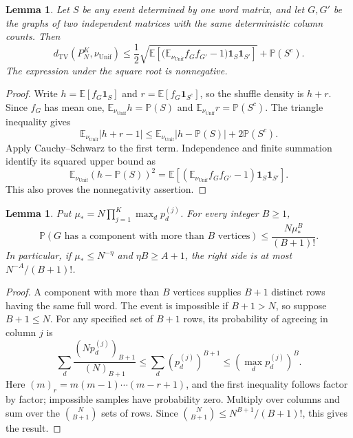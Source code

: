 \documentclass[11pt]{article}
\numberwithin{equation}{section}
\newtheorem{lemma}[theorem]{Lemma}
\theoremstyle{definition}
\theoremstyle{remark}
\newcommand{\E}{\mathbb E}
\newcommand{\Pp}{\mathbb P}
\newcommand{\TV}{\mathrm{TV}}
\newcommand{\Unif}{\mathrm{Unif}}
\newcommand{\dTV}{d_{\TV}}
\newcommand{\nuUnif}{\nu_{\Unif}}
\newcommand{\1}{\mathbf 1}
\begin{document}
\begin{lemma}%
\label{lem:upper-truncation}
Let $S$ be any event determined by one word matrix, and let $G,G'$ be
the graphs of two independent matrices with the same deterministic
column counts. Then
\begin{equation}\label{eq:upper-truncation}
 \dTV(P_N^K,\nuUnif)
 \le\frac12\sqrt{\E\left[
   \bigl(\E_{\nuUnif}f_Gf_{G'}-1\bigr)
                      \mathbf1_S\mathbf1_{S'}\right]}+\Pp(S^c).
\end{equation}
The expression under the square root is nonnegative.
\end{lemma}
\begin{proof}
Write $h=\E[f_G\mathbf1_S]$ and $r=\E[f_G\mathbf1_{S^c}]$,
so the shuffle density is $h+r$. Since $f_G$ has mean one,
$\E_{\nuUnif}h=\Pp(S)$ and $\E_{\nuUnif}r=\Pp(S^c)$.
The triangle inequality gives
\[
 \E_{\nuUnif}|h+r-1|
 \le\E_{\nuUnif}|h-\Pp(S)|+2\Pp(S^c).
\]
Apply Cauchy--Schwarz to the first term. Independence and finite
summation identify its squared upper bound as
\[
 \E_{\nuUnif}(h-\Pp(S))^2
 =\E[(\E_{\nuUnif}f_Gf_{G'}-1)\mathbf1_S\mathbf1_{S'}].
\]
This also proves the nonnegativity assertion.
\end{proof}

\begin{lemma}%
\label{lem:upper-components}
Put $\mu_*=N\prod_{j=1}^K\max_d p_d^{(j)}$.
For every integer $B\ge1$,
\begin{equation}\label{eq:upper-components}
 \Pp(G\text{ has a component with more than }B\text{ vertices})
       \le\frac{N\mu_*^B}{(B+1)!}.
\end{equation}
In particular, if $\mu_*\le N^{-\eta}$ and $\eta B\ge A+1$,
the right side is at most $N^{-A}/(B+1)!$.
\end{lemma}
\begin{proof}
A component with more than $B$ vertices supplies $B+1$ distinct rows
having the same full word. The event is impossible if $B+1>N$,
so suppose $B+1\le N$.
For any specified set of $B+1$ rows, its probability
of agreeing in column $j$ is
\[
 \sum_d\frac{(Np_d^{(j)})_{B+1}}{(N)_{B+1}}
 \le\sum_d(p_d^{(j)})^{B+1}
 \le(\max_d p_d^{(j)})^B.
\]
Here $(m)_r=m(m-1)\cdots(m-r+1)$, and the first inequality follows
factor by factor; impossible samples have probability zero. Multiply
over columns and sum over the $\binom N{B+1}$ sets of rows.
Since $\binom N{B+1}\le N^{B+1}/(B+1)!$, this gives the result.
\end{proof}
\end{document}
